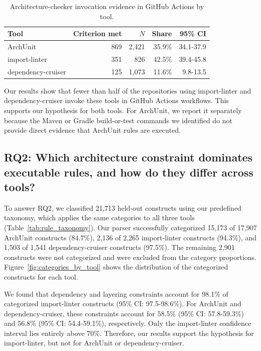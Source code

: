 \begin{table}[t]
\centering
\caption{Architecture-checker invocation evidence in GitHub Actions by tool.}
\label{tab:ci_results}
\setlength{\tabcolsep}{10pt}
\setlength{\aboverulesep}{0pt}
\setlength{\belowrulesep}{0pt}
\renewcommand{\arraystretch}{1.25}
\begin{tabular}{@{}lrrrr@{}}
\toprule
\textbf{Tool} & \textbf{Criterion met} & \textbf{$N$} &
\textbf{Share} & \textbf{95\% CI} \\
\midrule
\rowcolor{rowband}
ArchUnit            & 869 & 2{,}421 & 35.9\% & 34.1-37.9 \\
import-linter       & 351 & 826     & 42.5\% & 39.4-45.8 \\
\rowcolor{rowband}
dependency-cruiser  & 125 & 1{,}073 & 11.6\% &  9.8-13.5 \\
\bottomrule
\end{tabular}
\end{table}

%

\begin{keyfinding}
Our results show that fewer than half of the repositories using
import-linter and dependency-cruiser invoke these tools in GitHub
Actions workflows. This supports our hypothesis for both tools.
For ArchUnit, we report it separately because the Maven or Gradle
build-or-test commands we identified do not provide direct evidence
that ArchUnit rules are executed.
\end{keyfinding}


\subsection{RQ2: Which architecture constraint dominates executable rules, and how do they differ across tools?}
\label{sec:rq2}
To answer RQ2, we classified 21,713 held-out constructs using our
predefined taxonomy, which applies the same categories to all three
tools (Table~\ref{tab:rule_taxonomy}). Our parser successfully
categorized 15,173 of 17,907 ArchUnit constructs (84.7\%),
2,136 of 2,265 import-linter constructs (94.3\%), and
1,503 of 1,541 dependency-cruiser constructs (97.5\%). The remaining
2,901 constructs were not categorized and were excluded from the
category proportions. Figure~\ref{fig:categories_by_tool} shows
the distribution of the categorized constructs for each tool.


We found that dependency and layering constraints account for
98.1\% of categorized import-linter constructs (95\% CI:
97.5-98.6\%). For ArchUnit and dependency-cruiser, these
constraints account for 58.5\% (95\% CI: 57.8-59.3\%) and
56.8\% (95\% CI: 54.4-59.1\%), respectively. Only the
import-linter confidence interval lies entirely above 70\%.
Therefore, our results support the hypothesis for import-linter,
but not for ArchUnit or dependency-cruiser.

